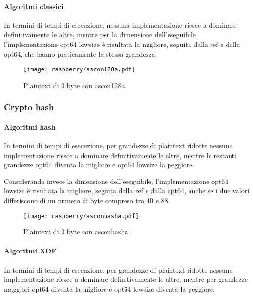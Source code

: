 \paragraph{Algoritmi classici}

In termini di tempi di esecuzione, nessuna implementazione riesce a dominare definitivamente le altre, mentre per la dimensione dell'eseguibile l'implementazione opt64 lowsize è risultata la migliore, seguita dalla ref e dalla opt64, che hanno praticamente la stessa grandezza.

\begin{figure}[H]
    \centering
    \texttt{[image: raspberry/ascon128a.pdf]}
    \caption{Plaintext di 0 byte con ascon128a.}
\end{figure}

\subsubsection{Crypto hash}

\paragraph{Algoritmi hash}

In termini di tempi di esecuzione, per grandezze di plaintext ridotte nessuna implementazione riesce a dominare definitivamente le altre, mentre le restanti grandezze opt64 diventa la migliore e opt64 lowsize la peggiore.

\noindent Considerando invece la dimensione dell'eseguibile, l'implementazione opt64 lowsize è risultata la migliore, seguita dalla ref e dalla opt64, anche se i due valori differiscono di un numero di byte compreso tra 40 e 88.

\begin{figure}[H]
    \centering
    \texttt{[image: raspberry/asconhasha.pdf]}
    \caption{Plaintext di 0 byte con asconhasha.}
\end{figure}

\paragraph{Algoritmi XOF}

In termini di tempi di esecuzione, per grandezze di plaintext ridotte nessuna implementazione riesce a dominare definitivamente le altre, mentre per grandezze maggiori opt64 diventa la migliore e opt64 lowsize diventa la peggiore.

